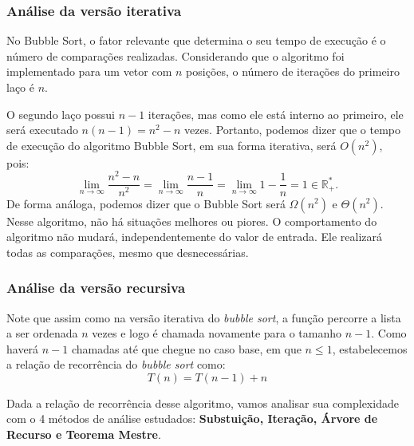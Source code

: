 \subsubsection{Análise da versão iterativa}


No Bubble Sort, o fator relevante que determina o seu tempo de execução é o número de comparações realizadas. Considerando que o algoritmo foi implementado para um vetor com \( n \) posições, o número de iterações do primeiro laço é \( n \).

O segundo laço possui \( n-1 \) iterações, mas como ele está interno ao primeiro, ele será executado \( n(n-1) = n^2 - n \) vezes. Portanto, podemos dizer que o tempo de execução do algoritmo Bubble Sort, em sua forma iterativa, será \( O(n^2) \), pois:
\[
	\lim_{n \rightarrow \infty} \frac{n^2 - n}{n^2} =
	\lim_{n \rightarrow \infty} \frac{n - 1}{n} =
	\lim_{n \rightarrow \infty} 1-\frac{1}{n} =
	1 \in \mathbb{R}^*_+.
\]
\indent De forma análoga, podemos dizer que o Bubble Sort será \( \Omega(n^2) \) e \( \Theta(n^2) \). Nesse algoritmo, não há situações melhores ou piores. O comportamento do algoritmo não mudará, independentemente do valor de entrada. Ele realizará todas as comparações, mesmo que desnecessárias.


\subsubsection{Análise da versão recursiva}
Note que assim como na versão iterativa do \textit{bubble sort}, a função percorre a lista a ser ordenada $n$ vezes e logo é chamada novamente para o tamanho $n - 1$. Como haverá $n - 1$ chamadas até que chegue no caso base, em que $n \leq 1$, estabelecemos a relação de recorrência do \textit{bubble sort} como:
$$
	T(n) = T(n - 1) + n
$$

\indent Dada a relação de recorrência desse algoritmo, vamos analisar sua complexidade com o 4 métodos de análise estudados: \textbf{Substuição, Iteração, Árvore de Recurso e Teorema Mestre}.

